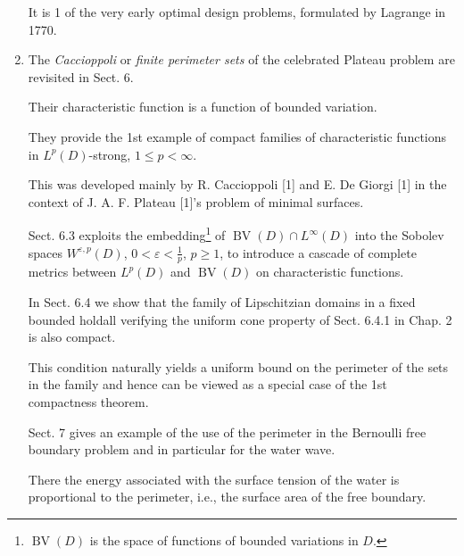 \documentclass{book}
\numberwithin{equation}{section}
\begin{document}
\begin{enumerate}
    It is 1 of the very early optimal design problems, formulated by Lagrange in 1770.
    \item The \textit{Caccioppoli} or \textit{finite perimeter sets} of the celebrated Plateau problem are revisited in Sect. 6.
    
    Their characteristic function is a function of bounded variation.
    
    They provide the 1st example of compact families of characteristic functions in $L^p(D)$-strong, $1\le p < \infty$.
    
    This was developed mainly by R. Caccioppoli [1] and E. De Giorgi [1] in the context of J. A. F. Plateau [1]'s problem of minimal surfaces.
    
    Sect. 6.3 exploits the embedding\footnote{$\operatorname{BV}(D)$ is the space of functions of bounded variations in $D$.} of $\operatorname{BV}(D)\cap L^\infty(D)$ into the Sobolev spaces $W^{\varepsilon,p}(D)$, $0 < \varepsilon < \frac{1}{p}$, $p\ge 1$, to introduce a cascade of complete metrics between $L^p(D)$ and $\operatorname{BV}(D)$ on characteristic functions.
    
    In Sect. 6.4 we show that the family of Lipschitzian domains in a fixed bounded holdall verifying the uniform cone property of Sect. 6.4.1 in Chap. 2 is also compact.
    
    This condition naturally yields a uniform bound on the perimeter of the sets in the family and hence can be viewed as a special case of the 1st compactness theorem.
    
    Sect. 7 gives an example of the use of the perimeter in the Bernoulli free boundary problem and in particular for the water wave.
    
    There the energy associated with the surface tension of the water is proportional to the perimeter, i.e., the surface area of the free boundary.
\end{enumerate}
\end{document}
